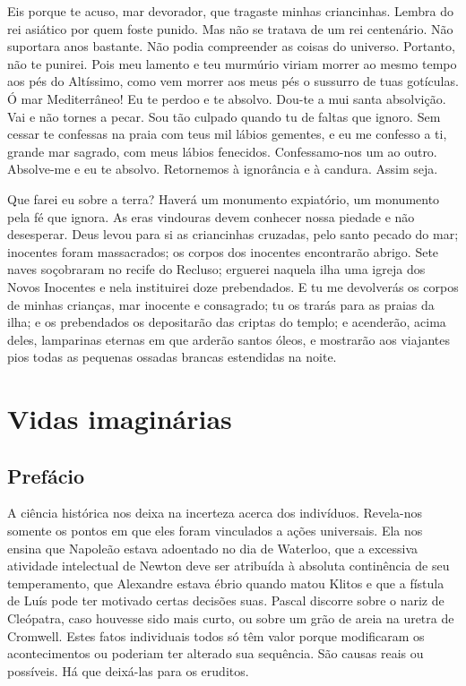 Eis porque te acuso, mar devorador, que tragaste minhas criancinhas. Lembra
do rei asiático por quem foste punido. Mas não se tratava de um rei
centenário. Não suportara anos bastante. Não podia compreender as coisas
do universo. Portanto, não te punirei. Pois meu lamento e teu murmúrio
viriam morrer ao mesmo tempo aos pés do Altíssimo, como vem morrer aos
meus pés o sussurro de tuas gotículas. Ó mar Mediterrâneo! Eu te perdoo e
te absolvo. Dou-te a mui santa absolvição. Vai e não tornes a pecar. Sou
tão culpado quando tu de faltas que ignoro. Sem cessar te confessas na
praia com teus mil lábios gementes, e eu me confesso a ti, grande mar
sagrado, com meus lábios fenecidos. Confessamo-nos um ao outro. Absolve-me
e eu te absolvo. Retornemos à ignorância e à candura. Assim seja.

Que farei eu sobre a terra? Haverá um monumento expiatório, um monumento
pela fé que ignora. As eras vindouras devem conhecer nossa piedade e não
desesperar. Deus levou para si as criancinhas cruzadas, pelo santo pecado
do mar; inocentes foram massacrados; os corpos dos inocentes encontrarão
abrigo. Sete naves soçobraram no recife do Recluso; erguerei naquela ilha
uma igreja dos Novos Inocentes e nela instituirei doze prebendados. E tu
me devolverás os corpos de minhas crianças, mar inocente e consagrado; tu
os trarás para as praias da ilha; e os prebendados os depositarão das
criptas do templo; e acenderão, acima deles, lamparinas eternas em que
arderão santos óleos, e mostrarão aos viajantes pios todas as pequenas
ossadas brancas estendidas na noite.


\part{Vidas imaginárias}

\chapter{Prefácio}


A ciência histórica nos deixa na incerteza acerca dos indivíduos.
Revela-nos somente os pontos em que eles foram vinculados a ações
universais. Ela nos ensina que Napoleão estava adoentado no dia de
Waterloo, que a excessiva atividade intelectual de Newton deve ser
atribuída à absoluta continência de seu temperamento, que Alexandre estava
ébrio quando matou Klitos e que a fístula de Luís  pode ter motivado
certas decisões suas. Pascal discorre sobre o nariz de Cleópatra, caso
houvesse sido mais curto, ou sobre um grão de areia na uretra de Cromwell.
Estes fatos individuais todos só têm valor porque modificaram os
acontecimentos ou poderiam ter alterado sua sequência. São causas reais ou
possíveis. Há que deixá-las para os eruditos.

